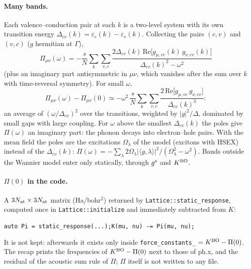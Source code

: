 \documentclass[11pt]{article}
\newcommand{\gs}{g^{\rm s}}
\newcommand{\KBO}{K^{\rm BO}}
\begin{document}
\paragraph{Many bands.} Each valence--conduction pair at each $k$ is a two-level system with its own transition
energy $\Delta_{cv}(k)=\varepsilon_c(k)-\varepsilon_v(k)$. Collecting the pairs $(c,v)$ and $(v,c)$ ($g$ hermitian at $\Gamma$),
\begin{equation}
\Pi_{\mu\nu}(\omega) = -\frac{s}{N}\sum_k\sum_{v,c}\frac{2\Delta_{cv}(k)\,\mathrm{Re}\big[g_{\mu,vc}(k)\,g_{\nu,cv}(k)\big]}{\Delta_{cv}(k)^2-\omega^2}
\end{equation}
(plus an imaginary part antisymmetric in $\mu\nu$, which vanishes after the sum over $k$ with time-reversal symmetry).
For small $\omega$,
\begin{equation}
\Pi_{\mu\nu}(\omega)-\Pi_{\mu\nu}(0) \simeq -\omega^2\,\frac{s}{N}\sum_k\sum_{v,c}\frac{2\,\mathrm{Re}\big[g_{\mu,vc}\,g_{\nu,cv}\big]}{\Delta_{cv}(k)^3}:
\end{equation}
an average of $(\omega/\Delta_{cv})^2$ over the transitions, weighted by $|g|^2/\Delta$, dominated by small gaps with
large coupling. For $\omega$ above the smallest $\Delta_{cv}(k)$ the poles give $\Pi(\omega)$ an imaginary part: the
phonon decays into electron--hole pairs. With the mean field the poles are the excitations $\Omega_\lambda$ of the
model (excitons with HSEX) instead of the $\Delta_{cv}(k)$:
$\Pi(\omega) = -\sum_\lambda 2\Omega_\lambda|\langle g,\lambda\rangle|^2/(\Omega_\lambda^2-\omega^2)$.
Bands outside the Wannier model enter only statically, through $\gs$ and $\KBO$.

\paragraph{$\Pi(0)$ in the code.} A $3N_{\rm at}\times 3N_{\rm at}$ matrix (Ha/bohr$^2$) returned by
\texttt{Lattice::static\_response}, computed once in \texttt{Lattice::initialize} and immediately subtracted from $K$:
\begin{center}
\texttt{auto Pi = static\_response(...);\quad K(mu, nu) -= Pi(mu, nu);}
\end{center}
It is not kept: afterwards it exists only inside \texttt{force\_constants\_} $=\KBO-\Pi(0)$. The recap prints the
frequencies of $\KBO-\Pi(0)$ next to those of ph.x, and the residual of the acoustic sum rule of $\Pi$; $\Pi$ itself
is not written to any file.
\end{document}
